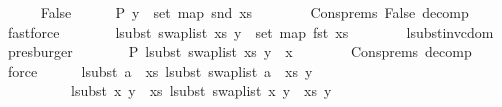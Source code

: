 \begin{isabellebody}
\ \ \ \ \isamarkupfalse%
\ False\isanewline
\ \ \ \ \isamarkupfalse%
\ P{}{\isacharcolon}{\kern0pt}\ {\isachardoublequoteopen}y\ {\isasymin}\ set\ {\isacharparenleft}{\kern0pt}map\ snd\ xs{\isacharparenright}{\kern0pt}{\isachardoublequoteclose}\isanewline
\ \ \ \ \ \ \isamarkupfalse%
\ Cons{\isachardot}{\kern0pt}prems{\isacharparenleft}{\kern0pt}{}{\isacharparenright}{\kern0pt}\ False\ decomp\ \isamarkupfalse%
\ fastforce\isanewline
\ \ \ \ \isamarkupfalse%
\ \isamarkupfalse%
\ {\isachardoublequoteopen}lsubst\ {\isacharparenleft}{\kern0pt}swap{\isacharunderscore}{\kern0pt}list\ xs{\isacharparenright}{\kern0pt}\ y\ {\isasymin}\ set\ {\isacharparenleft}{\kern0pt}map\ fst\ xs{\isacharparenright}{\kern0pt}{\isachardoublequoteclose}\isanewline
\ \ \ \ \ \ \isamarkupfalse%
\ lsubst{\isacharunderscore}{\kern0pt}inv{\isacharunderscore}{\kern0pt}cdom\ \isamarkupfalse%
\ presburger\isanewline
\ \ \ \ \isamarkupfalse%
\ \isamarkupfalse%
\ P{}{\isacharcolon}{\kern0pt}\ {\isachardoublequoteopen}lsubst\ {\isacharparenleft}{\kern0pt}swap{\isacharunderscore}{\kern0pt}list\ xs{\isacharparenright}{\kern0pt}\ y\ {\isasymnoteq}\ x{\isachardoublequoteclose}\isanewline
\ \ \ \ \ \ \isamarkupfalse%
\ Cons{\isachardot}{\kern0pt}prems{\isacharparenleft}{\kern0pt}{}{\isacharparenright}{\kern0pt}\ decomp\ \isamarkupfalse%
\ force\isanewline
\isanewline
\ \ \ \ \isamarkupfalse%
\ {\isachardoublequoteopen}lsubst\ {\isacharparenleft}{\kern0pt}a\ {\isacharhash}{\kern0pt}\ xs{\isacharparenright}{\kern0pt}\ {\isacharparenleft}{\kern0pt}lsubst\ {\isacharparenleft}{\kern0pt}swap{\isacharunderscore}{\kern0pt}list\ {\isacharparenleft}{\kern0pt}a\ {\isacharhash}{\kern0pt}\ xs{\isacharparenright}{\kern0pt}{\isacharparenright}{\kern0pt}\ y{\isacharparenright}{\kern0pt}\ {\isacharequal}{\kern0pt}\isanewline
\ \ \ \ \ \ \ \ \ \ lsubst\ {\isacharparenleft}{\kern0pt}{\isacharparenleft}{\kern0pt}x{\isacharcomma}{\kern0pt}\ y{\isacharprime}{\kern0pt}{\isacharparenright}{\kern0pt}\ {\isacharhash}{\kern0pt}\ xs{\isacharparenright}{\kern0pt}\ {\isacharparenleft}{\kern0pt}lsubst\ {\isacharparenleft}{\kern0pt}swap{\isacharunderscore}{\kern0pt}list\ {\isacharparenleft}{\kern0pt}{\isacharparenleft}{\kern0pt}x{\isacharcomma}{\kern0pt}\ y{\isacharprime}{\kern0pt}{\isacharparenright}{\kern0pt}\ {\isacharhash}{\kern0pt}\ xs{\isacharparenright}{\kern0pt}{\isacharparenright}{\kern0pt}\ y{\isacharparenright}{\kern0pt}{\isachardoublequoteclose}\isanewline

\end{isabellebody}
